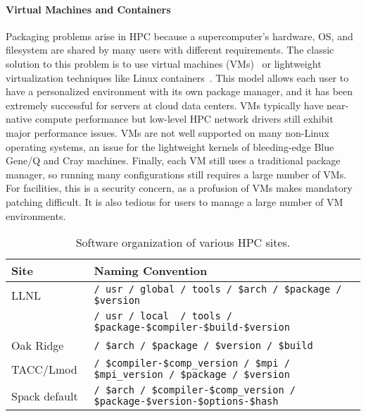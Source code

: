 \paragraph{Virtual Machines and Containers}

Packaging problems arise in HPC because a supercomputer's hardware, OS, and
filesystem are shared by many users with different requirements.  The classic
solution to this problem is to use virtual
machines (VMs)~\cite{barham2003xen,rosenblum1999vmware,smith2005architecture}
or lightweight virtualization techniques like Linux
containers~\cite{felter2014updated,merkel2014docker}. This model allows each
 user to have a personalized environment with its own package manager, and it
has been extremely successful for servers at cloud data centers. VMs typically
have near-native compute performance but low-level HPC network drivers still
exhibit major performance issues. VMs are not well supported on many
non-Linux operating systems, an issue for the lightweight
kernels of bleeding-edge Blue Gene/Q and Cray machines. 
Finally, each VM still uses a traditional package manager,
so running many configurations still requires a large number of VMs.
For facilities, this is a security concern, as a profusion of VMs makes 
mandatory patching difficult.  It is also tedious for users to manage a large
number of VM environments.

\begin{table*}\centering
\begin{tabular}{|l|l|}
\hline
Site           & Naming Convention \\
\hline
\hline
LLNL       & {\tt / usr / global / tools / \$arch / \$package / \$version} \\
           & {\tt / usr / local~ / tools / \$package-\$compiler-\$build-\$version } \\
\hline
Oak Ridge~\cite{jones+:cug08}  & {\tt / \$arch / \$package / \$version / \$build} \\
\hline
TACC/Lmod~\cite{mclay:lmod-tutorial}& {\tt / \$compiler-\$comp\_version / \$mpi / \$mpi\_version / \$package / \$version} \\
\hline
\hline
Spack default                  & {\tt / \$arch / \$compiler-\$comp\_version / \$package-\$version-\$options-\$hash} \\
\hline
\end{tabular}
\caption{
	Software organization of various HPC sites.
	\label{tab:naming-conventions}
}
\end{table*}

